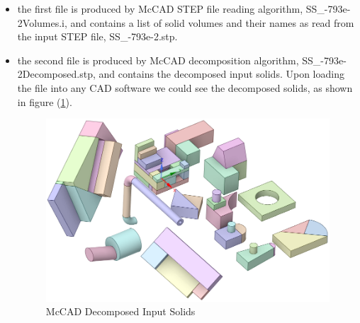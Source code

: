 \documentclass[12pt, a4paper, titlepage]{article}
\begin{document}
\begin{enumerate}
  \begin{itemize}
  	\item the first file is produced by McCAD STEP file reading algorithm, SS\_-793e-2Volumes.i, and contains a list of solid volumes and their names as read from the input STEP file, SS\_-793e-2.stp.
  	
    \item the second file is produced by McCAD decomposition algorithm, SS\_-793e-2Decomposed.stp, and contains the decomposed input solids. Upon loading the file into any CAD software we could see the decomposed solids, as shown in figure (\ref{fig:Decomposed Solids}).
	\begin{figure}[h!]
		\centering
		\includegraphics[scale=0.4]{figures/decomposedSolids.png}
		\caption{McCAD Decomposed Input Solids}
		\label{fig:Decomposed Solids}
	\end{figure}


\end{itemize}
\end{enumerate}
\end{document}
